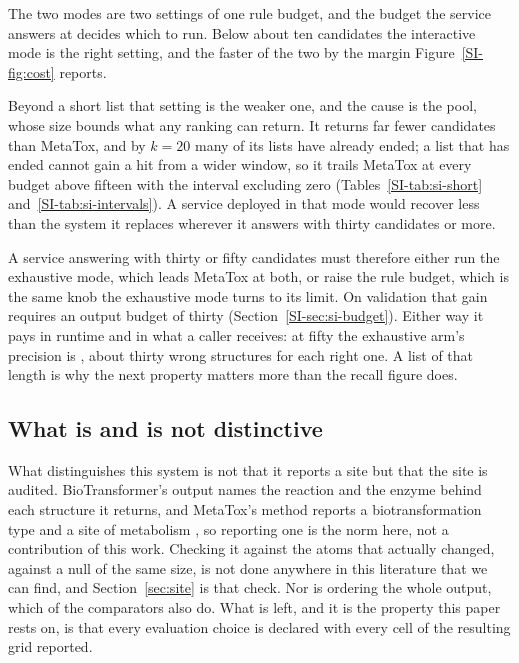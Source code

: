 The two modes are two settings of one rule budget, and the budget the service answers at decides
which to run. Below about ten candidates the interactive mode is the right setting, and the
faster of the two by the margin Figure~\ref{SI-fig:cost} reports.

Beyond a short list that setting is the weaker one, and the cause is the pool, whose size bounds what any ranking can return. It returns far fewer candidates than MetaTox, and by $k=20$ many of its lists have already ended; a list that has ended cannot gain a hit from a wider window, so it trails MetaTox at every budget above fifteen with the interval excluding zero (Tables~\ref{SI-tab:si-short} and~\ref{SI-tab:si-intervals}). A service deployed in that mode would recover
less than the system it replaces wherever it answers with thirty candidates or more.

A service answering with thirty or fifty candidates must therefore either run the exhaustive mode,
which leads MetaTox at both, or raise the rule budget, which is the same knob the exhaustive mode
turns to its limit. On validation that gain requires an output budget of thirty (Section~\ref{SI-sec:si-budget}). Either way it pays
in runtime and in what a caller receives: at fifty the exhaustive arm's precision is
\numPrecBankFiveZero{}, about thirty wrong structures for each right one. A list of that length is why the next property matters more than the recall figure does.

\subsection{What is and is not distinctive}

What distinguishes this system is not that it reports a site but that the site is audited.
BioTransformer's output names the reaction and the enzyme behind each structure it returns, and
MetaTox's method reports a biotransformation type and a site of metabolism \citep{Rudik_2017}, so
reporting one is the norm here, not a contribution of this work. Checking it against the atoms that actually
changed, against a null of the same size, is not done anywhere in this literature that we can find,
and Section~\ref{sec:site} is that check. Nor is ordering the whole output, which \numArmreturnOrderingWord{} of the \numComparatorsNWord{} comparators also do. What is left, and it is the property this
paper rests on, is that every evaluation choice is declared with every cell of the resulting grid
reported.

